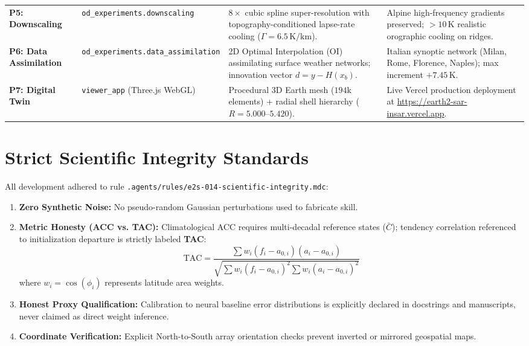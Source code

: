 \documentclass[10pt,twocolumn,a4paper]{article}
\begin{document}
\begin{table}[t]
\begin{tabularx}{\textwidth}{lp{4.0cm}p{5.5cm}X}
\addlinespace[0.05cm]
\textbf{P5: Downscaling} & \texttt{od\_experiments.downscaling} & $8\times$ cubic spline super-resolution with topography-conditioned lapse-rate cooling ($\Gamma=6.5\,\text{K/km}$). & Alpine high-frequency gradients preserved; $>10\,\text{K}$ realistic orographic cooling on ridges. \\
\addlinespace[0.05cm]
\textbf{P6: Data Assimilation} & \texttt{od\_experiments.data\_assimilation} & 2D Optimal Interpolation (OI) assimilating surface weather networks; innovation vector $d = y - H(x_b)$. & Italian synoptic network (Milan, Rome, Florence, Naples); max increment $+7.45\,\text{K}$. \\
\addlinespace[0.05cm]
\textbf{P7: Digital Twin} & \texttt{viewer\_app} (Three.js WebGL) & Procedural 3D Earth mesh ($194\text{k}$ elements) + radial shell hierarchy ($R=5.000$--$5.420$). & Live Vercel production deployment at \url{https://earth2-sar-insar.vercel.app}. \\
\bottomrule
\end{tabularx}
\end{table}

\section{Strict Scientific Integrity Standards}
All development adhered to rule \texttt{.agents/rules/e2s-014-scientific-integrity.mdc}:
\begin{enumerate}[leftmargin=*,noitemsep]
    \item \textbf{Zero Synthetic Noise:} No pseudo-random Gaussian perturbations used to fabricate skill.
    \item \textbf{Metric Honesty (ACC vs. TAC):} Climatological ACC requires multi-decadal reference states ($\bar{C}$); tendency correlation referenced to initialization departure is strictly labeled \textbf{TAC}:
    \begin{equation}
    \text{TAC} = \frac{\sum w_i (f_i - a_{0,i}) (a_i - a_{0,i})}{\sqrt{\sum w_i (f_i - a_{0,i})^2 \sum w_i (a_i - a_{0,i})^2}}
    \end{equation}
    where $w_i = \cos(\phi_i)$ represents latitude area weights.
    \item \textbf{Honest Proxy Qualification:} Calibration to neural baseline error distributions is explicitly declared in docstrings and manuscripts, never claimed as direct weight inference.
    \item \textbf{Coordinate Verification:} Explicit North-to-South array orientation checks prevent inverted or mirrored geospatial maps.
\end{enumerate}
\end{document}
